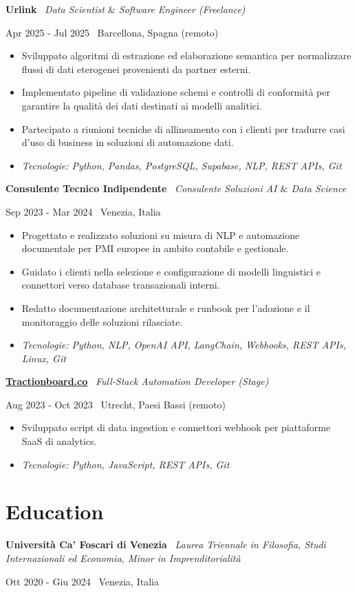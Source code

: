 \documentclass[a4paper,10pt]{article}
\newcommand{\role}[4]{%
  \vspace{2pt}\noindent
  \begin{minipage}[t]{0.70\textwidth}\raggedright\textbf{#1} \textbullet\ \textit{#3}\end{minipage}%
  \hfill
  \begin{minipage}[t]{0.28\textwidth}\raggedleft\footnotesize\color{gray}#2 \textbullet\ #4\end{minipage}%
  \vspace{1pt}%
}
\begin{document}
\role{Urlink}{Apr 2025 - Jul 2025}{Data Scientist $\&$ Software Engineer (Freelance)}{Barcellona, Spagna (remoto)}
\begin{itemize}
  \item Sviluppato algoritmi di estrazione ed elaborazione semantica per normalizzare flussi di dati eterogenei provenienti da partner esterni.
  \item Implementato pipeline di validazione schemi e controlli di conformità per garantire la qualità dei dati destinati ai modelli analitici.
  \item Partecipato a riunioni tecniche di allineamento con i clienti per tradurre casi d'uso di business in soluzioni di automazione dati.
  \item \textit{Tecnologie: Python, Pandas, PostgreSQL, Supabase, NLP, REST APIs, Git}
\end{itemize}

\role{Consulente Tecnico Indipendente}{Sep 2023 - Mar 2024}{Consulente Soluzioni AI $\&$ Data Science}{Venezia, Italia}
\begin{itemize}
  \item Progettato e realizzato soluzioni su misura di NLP e automazione documentale per PMI europee in ambito contabile e gestionale.
  \item Guidato i clienti nella selezione e configurazione di modelli linguistici e connettori verso database transazionali interni.
  \item Redatto documentazione architetturale e runbook per l'adozione e il monitoraggio delle soluzioni rilasciate.
  \item \textit{Tecnologie: Python, NLP, OpenAI API, LangChain, Webhooks, REST APIs, Linux, Git}
\end{itemize}

\role{\href{https://tractionboard.co}{Tractionboard.co}}{Aug 2023 - Oct 2023}{Full-Stack Automation Developer (Stage)}{Utrecht, Paesi Bassi (remoto)}
\begin{itemize}
  \item Sviluppato script di data ingestion e connettori webhook per piattaforme SaaS di analytics.
  \item \textit{Tecnologie: Python, JavaScript, REST APIs, Git}
\end{itemize}

\section{Education}
\role{Università Ca' Foscari di Venezia}{Ott 2020 - Giu 2024}{Laurea Triennale in Filosofia, Studi Internazionali ed Economia, Minor in Imprenditorialità}{Venezia, Italia}
\end{document}

